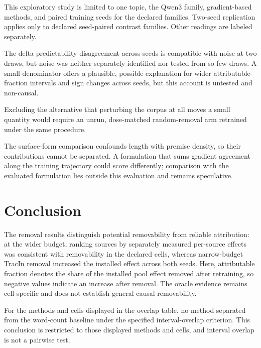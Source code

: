 \documentclass[10pt]{article}
\begin{document}
This exploratory study is limited to one topic, the Qwen3 family, gradient-based methods, and paired training seeds for the declared families. Two-seed replication applies only to declared seed-paired contrast families. Other readings are labeled separately.



The delta-predictability disagreement across seeds is compatible with noise at two draws, but noise was neither separately identified nor tested from so few draws. A small denominator offers a plausible, possible explanation for wider attributable-fraction intervals and sign changes across seeds, but this account is untested and non-causal.



Excluding the alternative that perturbing the corpus at all moves a small quantity would require an unrun, dose-matched random-removal arm retrained under the same procedure.



The surface-form comparison confounds length with premise density, so their contributions cannot be separated. A formulation that sums gradient agreement along the training trajectory could score differently; comparison with the evaluated formulation lies outside this evaluation and remains speculative.






\section{ Conclusion }
\label{sec:conclusion}

The removal results distinguish potential removability from reliable attribution: at the wider budget, ranking sources by separately measured per-source effects was consistent with removability in the declared cells, whereas narrow-budget TracIn removal increased the installed effect across both seeds. Here, attributable fraction denotes the share of the installed pool effect removed after retraining, so negative values indicate an increase after removal. The oracle evidence remains cell-specific and does not establish general causal removability.



For the methods and cells displayed in the overlap table, no method separated from the word-count baseline under the specified interval-overlap criterion. This conclusion is restricted to those displayed methods and cells, and interval overlap is not a pairwise test.
\end{document}
